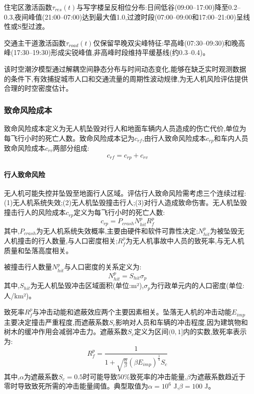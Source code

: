 住宅区激活函数$\tau_{res}(t)$与写字楼呈反相位分布:日间低谷(09:00--17:00)降至0.2--0.3,夜间峰值(21:00--07:00)达到最大值1.0,过渡时段(07:00--09:00和17:00--21:00)呈线性或S型过渡。

交通主干道激活函数$\tau_{road}(t)$仅保留早晚双尖峰特征:早高峰(07:30--09:30)和晚高峰(17:30--19:30)形成尖锐峰值,非高峰时段维持平缓基线(约0.3--0.4)。

该时空潮汐模型通过解耦空间静态分布与时间动态变化,能够在缺乏实时观测数据的条件下,有效捕捉城市人口和交通流量的周期性波动规律,为无人机风险评估提供合理的时空密度估计。

\subsubsection{致命风险成本}

致命风险成本定义为无人机坠毁对行人和地面车辆内人员造成的伤亡代价,单位为每飞行小时的死亡人数。致命风险成本记为$c_{rf}$,由行人致命风险成本$c_{rp}$和车内人员致命风险成本$c_{rv}$两部分组成:
\begin{equation}
c_{rf} = c_{rp} + c_{rv}
\label{eq:fatality_risk_total}
\end{equation}

\paragraph{行人致命风险}

无人机可能失控并坠毁至地面行人区域。评估行人致命风险需考虑三个连续过程:(1)无人机系统失效;(2)无人机坠毁撞击行人;(3)对行人造成致命伤害。无人机坠毁撞击行人的风险成本$c_{rp}$定义为每飞行小时的死亡人数:
\begin{equation}
c_{rp} = P_{crash} N_{hit}^p R_f^p
\label{eq:pedestrian_fatality}
\end{equation}
其中,$P_{crash}$为无人机系统失效概率,主要由硬件和软件可靠性决定;$N_{hit}^p$为被坠毁无人机撞击的行人数量,与人口密度相关;$R_f^p$为无人机事故中人员的致死率,与无人机质量和坠落高度相关。

被撞击行人数量$N_{hit}^p$与人口密度的关系定义为:
\begin{equation}
N_{hit}^p = S_{hit} \sigma_p
\label{eq:pedestrian_hit_count}
\end{equation}
其中,$S_{hit}$为无人机坠毁冲击区域面积(单位:m²),$\sigma_p$为行政单元内的人口密度(单位:人/km²)。

致死率$R_f^p$与冲击动能和遮蔽效应两个主要因素相关。坠落无人机的冲击动能$E_{imp}$主要决定撞击严重程度,而遮蔽系数$S_c$影响对人员和车辆的冲击程度,因为建筑物和树木的缓冲作用会减弱冲击力。遮蔽系数$S_c$定义为区间$(0, 1]$内的实数,致死率表示为:
\begin{equation}
R_f^p = \frac{1}{1 + \sqrt{\frac{\alpha}{\beta}} \left(\beta E_{imp}\right)^{\frac{1}{4}} S_c}
\label{eq:fatality_rate}
\end{equation}
其中,$\alpha$为遮蔽系数$S_c=0.5$时可能导致50\%致死率的冲击能量,$\beta$为遮蔽系数趋近于零时导致致死所需的冲击能量阈值。典型取值为$\alpha=10^6$ J,$\beta=100$ J。

